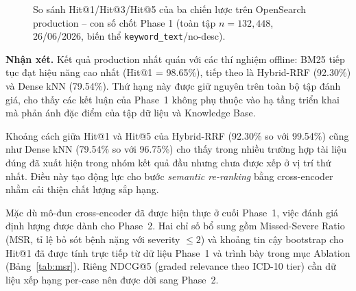 \begin{figure}[H]
  \centering
  \caption{So sánh Hit@1/Hit@3/Hit@5 của ba chiến lược trên OpenSearch production -- con số chốt Phase 1 (toàn tập $n=132{,}448$, 26/06/2026, biến thể \texttt{keyword\_text}/no-desc).}
  \label{fig:bar}
\end{figure}

\textbf{Nhận xét.} Kết quả production nhất quán với các thí nghiệm offline: BM25 tiếp tục đạt hiệu năng cao nhất (Hit@1 = 98.65\%), tiếp theo là Hybrid-RRF (92.30\%) và Dense kNN (79.54\%). Thứ hạng này được giữ nguyên trên toàn bộ tập đánh giá, cho thấy các kết luận của Phase~1 không phụ thuộc vào hạ tầng triển khai mà phản ánh đặc điểm của tập dữ liệu và Knowledge Base.

Khoảng cách giữa Hit@1 và Hit@5 của Hybrid-RRF (92.30\% so với 99.54\%) cũng như Dense kNN (79.54\% so với 96.75\%) cho thấy trong nhiều trường hợp tài liệu đúng đã xuất hiện trong nhóm kết quả đầu nhưng chưa được xếp ở vị trí thứ nhất. Điều này tạo động lực cho bước \emph{semantic re-ranking} bằng cross-encoder nhằm cải thiện chất lượng sắp hạng.

Mặc dù mô-đun cross-encoder đã được hiện thực ở cuối Phase~1, việc đánh giá định lượng được dành cho Phase~2. Hai chỉ số bổ sung gồm Missed-Severe Ratio (MSR, tỉ lệ bỏ sót bệnh nặng với severity $\le 2$) và khoảng tin cậy bootstrap cho Hit@1 đã được tính trực tiếp từ dữ liệu Phase~1 và trình bày trong mục Ablation (Bảng~\ref{tab:msr}). Riêng NDCG@5 (graded relevance theo ICD-10 tier) cần dữ liệu xếp hạng per-case nên được dời sang Phase~2.

